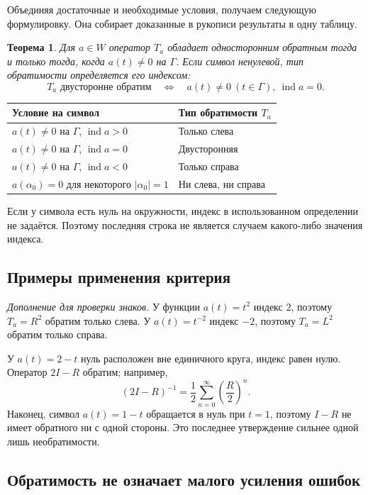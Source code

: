 \documentclass[12pt,a4paper]{article}
\newtheorem{theorem}{Теорема}
\theoremstyle{definition}
\theoremstyle{remark}
\DeclareMathOperator{\ind}{ind}
\begin{document}
Объединяя достаточные и необходимые условия, получаем следующую
формулировку. Она собирает доказанные в рукописи результаты в одну таблицу.

\begin{theorem}
Для $a\in W$ оператор $T_a$ обладает односторонним обратным
тогда и только тогда, когда $a(t)\ne0$ на $\Gamma$.
Если символ ненулевой, тип обратимости определяется его индексом:
\[
  \boxed{T_a\text{ двусторонне обратим}
  \quad\Longleftrightarrow\quad
  a(t)\ne0\ (t\in\Gamma),\ \ind a=0}.
\]
\end{theorem}

\begin{center}
\renewcommand{\arraystretch}{1.35}
\begin{tabular}{|p{}|p{}|}
\hline
Условие на символ & Тип обратимости $T_a$\\\hline
$a(t)\ne0$ на $\Gamma$, $\ind a>0$ & Только слева\\\hline
$a(t)\ne0$ на $\Gamma$, $\ind a=0$ & Двусторонняя\\\hline
$a(t)\ne0$ на $\Gamma$, $\ind a<0$ & Только справа\\\hline
$a(\alpha_0)=0$ для некоторого $|\alpha_0|=1$ & Ни слева, ни справа\\\hline
\end{tabular}
\end{center}

Если у символа есть нуль на окружности, индекс в использованном
определении не задаётся. Поэтому последняя строка не является
случаем какого-либо значения индекса.

\subsection{Примеры применения критерия}

\emph{Дополнение для проверки знаков.} У функции $a(t)=t^2$
индекс $2$, поэтому $T_a=R^2$ обратим только слева.
У $a(t)=t^{-2}$ индекс $-2$, поэтому $T_a=L^2$ обратим только справа.

У $a(t)=2-t$ нуль расположен вне единичного круга, индекс равен
нулю. Оператор $2I-R$ обратим; например,
\[
  (2I-R)^{-1}=\frac12\sum_{n=0}^{\infty}\left(\frac R2\right)^n.
\]
Наконец, символ $a(t)=1-t$ обращается в нуль при $t=1$,
поэтому $I-R$ не имеет обратного ни с одной стороны.
Это последнее утверждение сильнее одной лишь необратимости.

\subsection{Обратимость не означает малого усиления ошибок}
\end{document}
